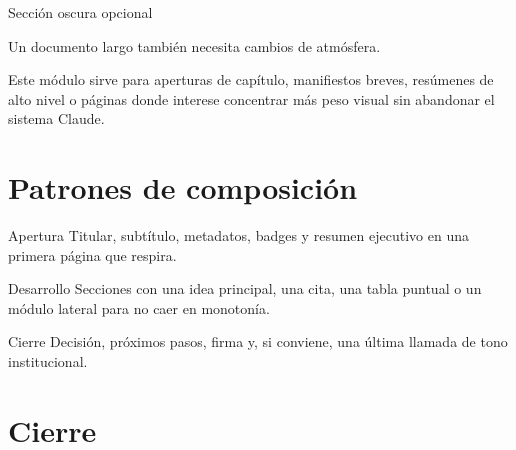 \documentclass[11pt,a4paper]{article}
\newcommand{\DisplayFont}{\rmfamily}
\begin{document}
\clearpage

\begin{claudedarkpanel}{Sección oscura opcional}
{\DisplayFont\fontsize{24}{28}\selectfont\color{claudeIvory}Un documento largo también necesita cambios de atmósfera.\par}

\vspace{0.5em}
{\color{claudeWarmSilver}Este módulo sirve para aperturas de capítulo, manifiestos breves, resúmenes de alto nivel o páginas donde interese concentrar más peso visual sin abandonar el sistema Claude.}

\vspace{0.9em}
\hspace{0.35em}
\hspace{0.35em}
\end{claudedarkpanel}

\section{Patrones de composición}


\begin{tcbraster}[
  raster columns=3,
  raster equal height=rows,
  raster column skip=8pt,
  raster before skip=0pt,
  raster after skip=0pt
]
\begin{claudeaside}{Apertura}
Titular, subtítulo, metadatos, badges y resumen ejecutivo en una primera página que respira.
\end{claudeaside}

\begin{claudeaside}{Desarrollo}
Secciones con una idea principal, una cita, una tabla puntual o un módulo lateral para no caer en monotonía.
\end{claudeaside}

\begin{claudeaside}{Cierre}
Decisión, próximos pasos, firma y, si conviene, una última llamada de tono institucional.
\end{claudeaside}
\end{tcbraster}

\section{Cierre}
\end{document}
